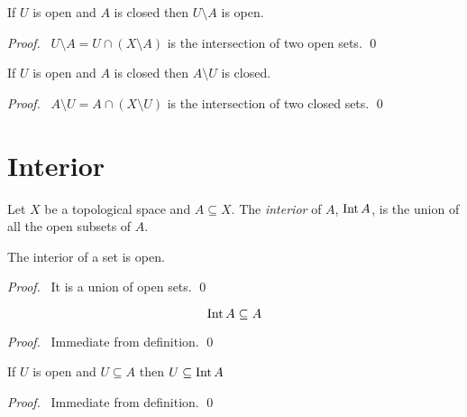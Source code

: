 \begin{proposition}
    If $U$ is open and $A$ is closed then $U \setminus A$ is open.
\end{proposition}

\begin{proof}
    \pf\ $U \setminus A = U \cap (X \setminus A)$ is the intersection of two open sets. \qed
\end{proof}

\begin{proposition}
    If $U$ is open and $A$ is closed then $A \setminus U$ is closed.
\end{proposition}

\begin{proof}
    \pf\ $A \setminus U = A \cap (X \setminus U)$ is the intersection of two closed sets. \qed
\end{proof}

\section{Interior}

\begin{definition}[Interior]
    Let $X$ be a topological space and $A \subseteq X$. The \emph{interior} of $A$, $\operatorname{Int} A$, is the union
    of all the open subsets of $A$.
\end{definition}

\begin{lemma}
    \label{lemma:interior_open}
    The interior of a set is open.
\end{lemma}

\begin{proof}
    \pf\ It is a union of open sets. \qed
\end{proof}

\begin{lemma}
    \[ \operatorname{Int} A \subseteq A \]
\end{lemma}

\begin{proof}
    \pf\ Immediate from definition. \qed
\end{proof}

\begin{lemma}
    If $U$ is open and $U \subseteq A$ then $U \subseteq \operatorname{Int} A$
\end{lemma}

\begin{proof}
    \pf\ Immediate from definition. \qed
\end{proof}

